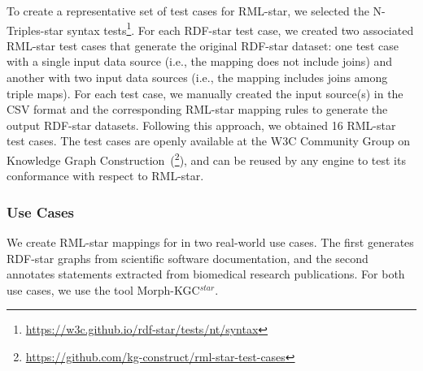 To create a representative set of test cases for \mbox{RML-star}, we selected the N-Triples-star syntax tests\footnote{\url{https://w3c.github.io/rdf-star/tests/nt/syntax}}.  %
For each \mbox{RDF-star} test case, we created two associated \mbox{RML-star} test cases that generate the original \mbox{RDF-star} dataset: one test case with a single input data source (i.e., the mapping does not include joins) and another with two input data sources (i.e., the mapping includes joins among triple maps).
For each test case, we manually created the input source(s) in the CSV format and the corresponding \mbox{RML-star} mapping rules to generate the output \mbox{RDF-star} datasets.
Following this approach, we obtained 16 \mbox{RML-star} test cases.
The test cases are openly available at the W3C Community Group on Knowledge Graph Construction~(\footnote{\url{https://github.com/kg-construct/rml-star-test-cases}}),
and can be reused by any engine to test its conformance with respect to \mbox{RML-star}.


\subsubsection{Use Cases}
\label{sec:chp4_star_usecases}

We create RML-star mappings for in two real-world use cases. 
The first generates \mbox{RDF-star} graphs from scientific software documentation, 
and the second annotates statements extracted from biomedical research publications. 
For both use cases, we use the tool \mbox{Morph-KGC$^{star}$}.















